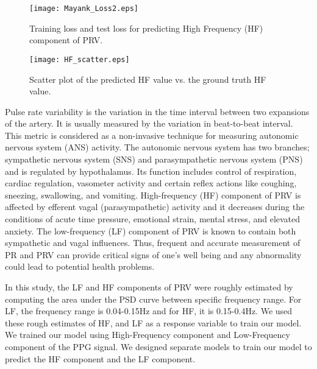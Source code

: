%

%

%


%
%
%
%
%
%
%
%
%
%
%
%
%
%
%




\begin{figure}[htbp]
	\centering
	\texttt{[image: Mayank\_Loss2.eps]}
	\vspace{-.1in}
	\caption{Training loss and test loss for predicting High Frequency (HF) component of PRV.}
	\label{fig:HF}
	\vspace{-.1in}
\end{figure}

\begin{figure}
	\centering
	\texttt{[image: HF\_scatter.eps]}
	\vspace{-.1in}
	\caption{Scatter plot of the predicted HF value vs. the ground truth HF value.}
	\label{fig:scatter_HF}
	\vspace{-.1in}
\end{figure}



Pulse  rate  variability  is  the  variation  in  the  time  interval between two expansions of the artery. It is usually measured by the variation in beat-to-beat interval. This metric is considered as a non-invasive technique for measuring autonomic nervous system  (ANS)  activity.  The  autonomic  nervous  system has  two  branches;  sympathetic  nervous  system  (SNS)  and parasympathetic  nervous  system  (PNS)  and  is  regulated  by hypothalamus.  Its  function  includes  control  of  respiration, cardiac regulation, vasometer activity and certain reflex actions like  coughing,  sneezing,  swallowing,  and  vomiting.  High-frequency  (HF)  component  of  PRV  is  affected  by  efferent vagal  (parasympathetic)  activity  and  it  decreases  during  the conditions  of  acute  time  pressure,  emotional  strain,  mental stress,  and  elevated  anxiety.  The  low-frequency (LF) component of PRV is known to contain both sympathetic and  vagal  influences.  Thus,  frequent  and  accurate  measurement  of  PR  and  PRV  can  provide  critical  signs  of  one's well being and any abnormality could lead to potential health problems.

In this study, the LF and HF components of PRV were roughly estimated by computing the area under the PSD curve between specific frequency range. For LF, the frequency range is 0.04-0.15Hz and for HF, it is 0.15-0.4Hz. We used these rough estimates of HF, and LF as a response variable to train our model.   We trained our model using High-Frequency component and Low-Frequency component of the PPG signal. We designed separate models to train our model to predict  the HF component and the LF component. 

